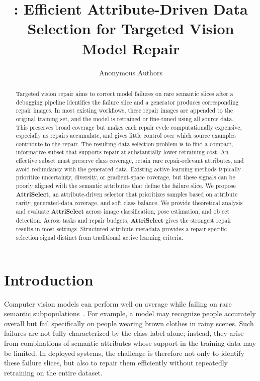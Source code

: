 \documentclass[10pt,twocolumn,letterpaper]{article}
\title{{\fontsize{13}{16}\selectfont \modelplain: Efficient Attribute-Driven Data Selection for Targeted Vision Model Repair}}
\author{%
  Anonymous Authors
}
\newcommand{\modelname}{AttriSelect}
\newcommand{\model}{\textcolor{darkteal}{\textbf{\modelname}}\xspace}
\begin{document}
\maketitle

\begin{abstract}
Targeted vision repair aims to correct model failures on rare semantic slices after a debugging pipeline identifies the failure slice and a generator produces corresponding repair images. In most existing workflows, these repair images are appended to the original training set, and the model is retrained or fine-tuned using all source data. This preserves broad coverage but makes each repair cycle computationally expensive, especially as repairs accumulate, and gives little control over which source examples contribute to the repair. The resulting data selection problem is to find a compact, informative subset that supports repair at substantially lower retraining cost. An effective subset must preserve class coverage, retain rare repair-relevant attributes, and avoid redundancy with the generated data. Existing active learning methods typically prioritize uncertainty, diversity, or gradient-space coverage, but these signals can be poorly aligned with the semantic attributes that define the failure slice. We propose \textbf{\model}, an attribute-driven selector that prioritizes samples based on attribute rarity, generated-data coverage, and soft class balance. We provide theoretical analysis and evaluate \model across image classification, pose estimation, and object detection. Across tasks and repair budgets, \model gives the strongest repair results in most settings. Structured attribute metadata provides a repair-specific selection signal distinct from traditional active learning criteria.
\end{abstract}

\section{Introduction}

Computer vision models can perform well on average while failing on rare semantic subpopulations~\citep{eyuboglu2022domino,chen2023hibug}. For example, a model may recognize people accurately overall but fail specifically on people wearing brown clothes in rainy scenes. Such failures are not fully characterized by the class label alone; instead, they arise from combinations of semantic attributes whose support in the training data may be limited. In deployed systems, the challenge is therefore not only to identify these failure slices, but also to repair them efficiently without repeatedly retraining on the entire dataset.
\end{document}
